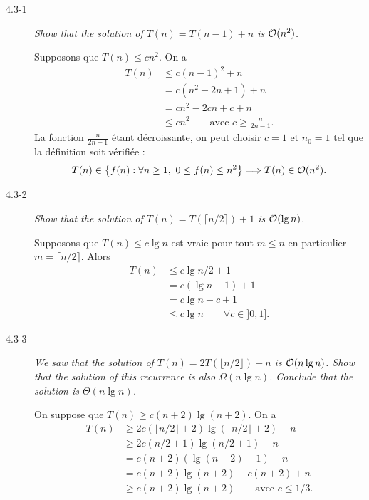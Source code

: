 \begin{description}
  \item[4.3-1] {\itshape Show that the solution of $T(n) = T(n-1) + n$ is $\mathcal{O}(n^2)$.}

    \begin{ex}
      Supposons que $T(n) \le cn^2$. On a 
      \begin{align*}
        T(n) &\le c(n-1)^2 + n\\
        &= c(n^2-2n+1)+n\\
        &= cn^2 - 2cn + c + n\\
        &\le cn^2 \quad\quad \textrm{avec }c \ge \frac{n}{2n-1}.
      \end{align*}
      La fonction $\frac{n}{2n-1}$ \'etant d\'ecroissante, on peut choisir $c = 1$ et $n_0 = 1$ tel que la d\'efinition soit v\'erifi\'ee : 
      \begin{align*}
        T(n) \in \left\{ f(n) : \forall n \ge 1,~ 0 \le f(n) \le n^2 \right\}  \Longrightarrow T(n) \in \mathcal{O}(n^2).
      \end{align*}

    \end{ex}

  \item[4.3-2] {\itshape Show that the solution of $T(n) = T(\lceil n/2 \rceil)+1$ is $\mathcal{O}(\lg n)$.}

    \begin{ex}
      Supposons que $T(n) \le c\lg n$ est vraie pour tout $m \le n$ en particulier ${m = \lceil n/2 \rceil}$. Alors 
      \begin{align*}
        T(n) &\le c\lg n/2 + 1\\
        &= c(\lg n - 1) + 1\\
        &= c \lg n -c + 1\\
        &\le c\lg n \quad\quad \forall c \in ]0, 1].
      \end{align*}
    \end{ex}

  \item[4.3-3] {\itshape We saw that the solution of $T(n) = 2T(\lfloor n/2 \rfloor) + n$ is $\mathcal{O}(n \lg n)$. Show that the solution of this recurrence is also $\Omega(n \lg n)$. Conclude that the solution is $\Theta(n \lg n)$.}
  \begin{ex} %
    On suppose que $T(n) \ge c(n+2)\lg(n+2)$. On a 
    \begin{align*}
      T(n) &\ge 2c(\lfloor n/2\rfloor+2)\lg(\lfloor n/2\rfloor+2) + n\\
        &\ge 2c(n/2+1)\lg(n/2+1)+n \\
        &= c(n+2)(\lg(n+2)-1)+n\\
        &= c(n+2)\lg(n+2)-c(n+2)+n\\
        &\ge c(n+2)\lg(n+2) \quad\quad \textrm{avec } c \le 1/3. 
    \end{align*}


\end{ex}
\end{description}
